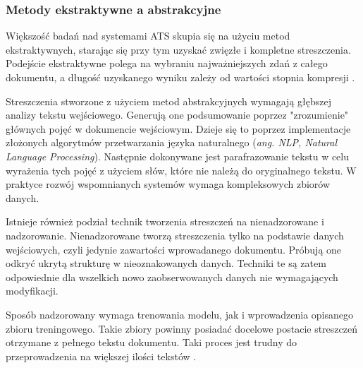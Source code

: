 \documentclass[12pt,a4paper,twoside]{article}
\begin{document}
\subsubsection{Metody ekstraktywne a abstrakcyjne}
Większość badań nad systemami ATS skupia się na użyciu metod ekstraktywnych, starając się przy tym uzyskać zwięzłe i kompletne streszczenia. Podejście ekstraktywne polega na wybraniu najważniejszych zdań z całego dokumentu, a długość uzyskanego wyniku zależy od wartości stopnia kompresji \cite{Gambhir2017}. \par
Streszczenia stworzone z użyciem metod abstrakcyjnych wymagają głębszej analizy tekstu wejściowego. Generują one podsumowanie poprzez "zrozumienie" głównych pojęć w dokumencie wejściowym. Dzieje się to poprzez implementacje złożonych algorytmów przetwarzania języka naturalnego (\textit{ang. NLP, Natural Language Processing}). Następnie dokonywane jest parafrazowanie tekstu w celu wyrażenia tych pojęć z użyciem słów, które nie należą do oryginalnego tekstu. W praktyce rozwój wspomnianych systemów wymaga kompleksowych zbiorów danych.\par
Istnieje również podział technik tworzenia streszczeń na nienadzorowane i nadzorowanie. Nienadzorowane tworzą streszczenia tylko na podstawie danych wejściowych, czyli jedynie zawartości wprowadanego dokumentu. Próbują one odkryć ukrytą strukturę w nieoznakowanych danych. Techniki te są zatem odpowiednie dla wszelkich nowo zaobserwowanych danych nie wymagających modyfikacji.\par
Sposób nadzorowany wymaga trenowania modelu, jak i wprowadzenia opisanego zbioru treningowego. Takie zbiory powinny posiadać docelowe postacie streszczeń otrzymane z pełnego tekstu dokumentu. Taki proces jest trudny do przeprowadzenia na większej ilości tekstów \cite{ELKASSAS2021113679}.
\end{document}
